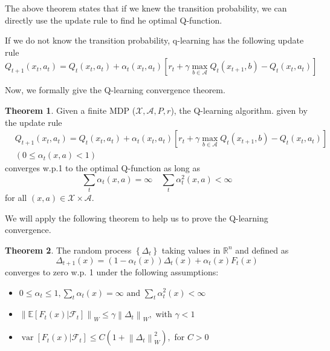 \documentclass[a4paper]{article}
\theoremstyle{definition}
\newtheorem{theo}{Theorem}[section]
\begin{document}
The above theorem states that if we knew the transition probability, we can directly use the update rule to find he optimal Q-function.

If we do not know the transition probability, q-learning has the following update rule
\begin{equation}
Q_{t+1}\left(x_{t}, a_{t}\right)=Q_{t}\left(x_{t}, a_{t}\right)+\alpha_{t}\left(x_{t}, a_{t}\right)\left[r_{t}+\gamma \max _{b \in \mathcal{A}} Q_{t}\left(x_{t+1}, b\right)-Q_{t}\left(x_{t}, a_{t}\right)\right]
\end{equation}

Now, we formally give the Q-learning convergence theorem.

\begin{theo}
Given a finite MDP ($\mathcal{X},\mathcal{A}, P, r$), the Q-learning algorithm. given by the update rule
\begin{align}
&Q_{t+1}\left(x_{t}, a_{t}\right)=Q_{t}\left(x_{t}, a_{t}\right)+\alpha_{t}\left(x_{t}, a_{t}\right)\left[r_{t}+\gamma \max _{b \in \mathcal{A}} Q_{t}\left(x_{t+1}, b\right)-Q_{t}\left(x_{t}, a_{t}\right)\right] \hspace{1cm}\\
&(0 \leq \alpha_{t}(x, a)<1)
\end{align}
converges w.p.1 to the optimal Q-function as long as
\begin{equation}
\sum_{t} \alpha_{t}(x, a)=\infty \quad \sum_{t} \alpha_{t}^{2}(x, a)<\infty
\end{equation}
for all $(x,a) \in \mathcal{X} \times \mathcal{A}$.
\end{theo}

We will apply the following theorem to help us to prove the Q-learning convergence.
\begin{theo}
 The random process \(\left\{\Delta_{t}\right\}\) taking values in \(\mathbb{R}^{n}\) and defined as
$$
\Delta_{t+1}(x)=\left(1-\alpha_{t}(x)\right) \Delta_{t}(x)+\alpha_{t}(x) F_{t}(x)
$$
converges to zero w.p. 1 under the following assumptions:\\
\begin{itemize}
\item
$
0 \leq \alpha_{t} \leq 1, \sum_{t} \alpha_{t}(x)=\infty \text { and } \sum_{t} \alpha_{t}^{2}(x)<\infty
$
\item \(\left\|\mathbb{E}\left[F_{t}(x) | \mathcal{F}_{t}\right]\right\|_{W} \leq \gamma\left\|\Delta_{t}\right\|_{W},\) with \(\gamma<1\)\\
\item \( \operatorname{var}\left[F_{t}(x) | \mathcal{F}_{t}\right] \leq C\left(1+\left\|\Delta_{t}\right\|_{W}^{2}\right),\) for \(C>0\)
\end{itemize}
\end{theo}
\end{document}
